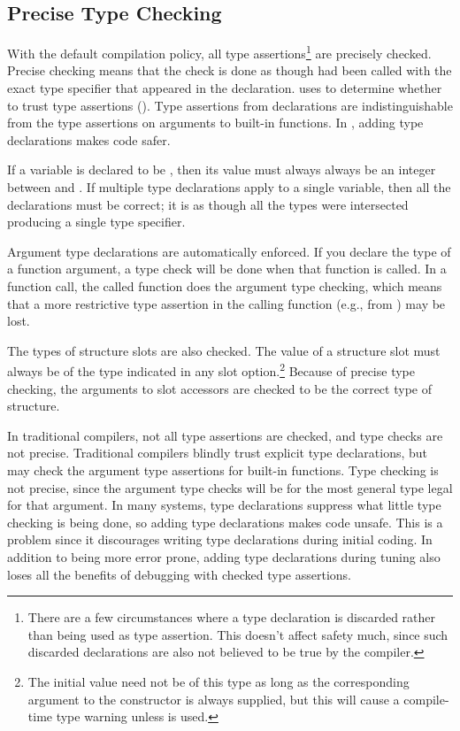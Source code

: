 \subsection{Precise Type Checking}
\label{precise-type-checks}

With the default compilation policy, all type
assertions\footnote{There are a few circumstances where a type
  declaration is discarded rather than being used as type assertion.
  This doesn't affect safety much, since such discarded declarations
  are also not believed to be true by the compiler.}  are precisely
checked.  Precise checking means that the check is done as though
 had been called with the exact type specifier that
appeared in the declaration.  \python{} uses  to determine
whether to trust type assertions ().  Type
assertions from declarations are indistinguishable from the type
assertions on arguments to built-in functions.  In \python, adding
type declarations makes code safer.

If a variable is declared to be , then its
value must always always be an integer between  and .
If multiple type declarations apply to a single variable, then all the
declarations must be correct; it is as though all the types were
intersected producing a single  type specifier.

Argument type declarations are automatically enforced.  If you declare
the type of a function argument, a type check will be done when that
function is called.  In a function call, the called function does the
argument type checking, which means that a more restrictive type
assertion in the calling function (e.g., from ) may be lost.

The types of structure slots are also checked.  The value of a
structure slot must always be of the type indicated in any 
slot option.\footnote{The initial value need not be of this type as
  long as the corresponding argument to the constructor is always
  supplied, but this will cause a compile-time type warning unless
   is used.} Because of precise type checking,
the arguments to slot accessors are checked to be the correct type of
structure.

In traditional \llisp{} compilers, not all type assertions are
checked, and type checks are not precise.  Traditional compilers
blindly trust explicit type declarations, but may check the argument
type assertions for built-in functions.  Type checking is not precise,
since the argument type checks will be for the most general type legal
for that argument.  In many systems, type declarations suppress what
little type checking is being done, so adding type declarations makes
code unsafe.  This is a problem since it discourages writing type
declarations during initial coding.  In addition to being more error
prone, adding type declarations during tuning also loses all the
benefits of debugging with checked type assertions.

